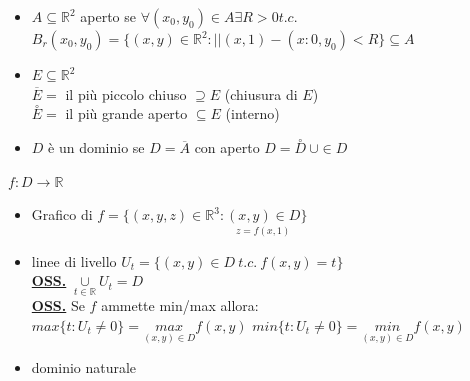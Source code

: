 \documentclass[a4paper, oneside]{article}
\begin{document}
            \begin{itemize}
            \item $A \subseteq \mathbb{R}^2$ aperto se $\forall (x_0, y_0) \in A \exists R>0 t.c.$\\
            $B_r(x_0,y_0) = \{(x,y) \in \mathbb{R}^2 : ||(x,1) -(x:0, y_0) <R \} \subseteq A$\\
            \item $E \subseteq \mathbb{R}^2$\\
                $\overline{E} = $ il più piccolo chiuso $\supseteq E$ (chiusura di $E$)\\
                $\overset{\circ}{E} = $ il più grande aperto $\subseteq E$ (interno)
            \item $D$ è un dominio se $D=\overline{A}$ con aperto $D= \overset{\circ}{D} \ \cup \in D$ 
            \end{itemize}
            $f:D \to \mathbb{R}$\\
            \begin{itemize}
                \item Grafico di $f=\{(x,y,z) \in \mathbb{R}^3: \underset{z = f(x,1)}{(x,y) \in D}\}$\\
                \item linee di livello $U_t = \{(x,y) \in D \ t.c. \ f(x,y) = t \}$
                \hfil\\
                \underline{\textbf{OSS.}} $\underset{t \in \mathbb{R}}{\cup} U_t = D$
                \hfil\\
                \underline{\textbf{OSS.}} Se $f$ ammette min/max allora:\\
                $max\{t: U_t \neq 0\} = \underset{(x,y) \in D}{max} f(x,y)$
                $min\{t: U_t \neq 0\} = \underset{(x,y) \in D}{min} f(x,y)$

                \item dominio naturale
            \end{itemize}
\end{document}
